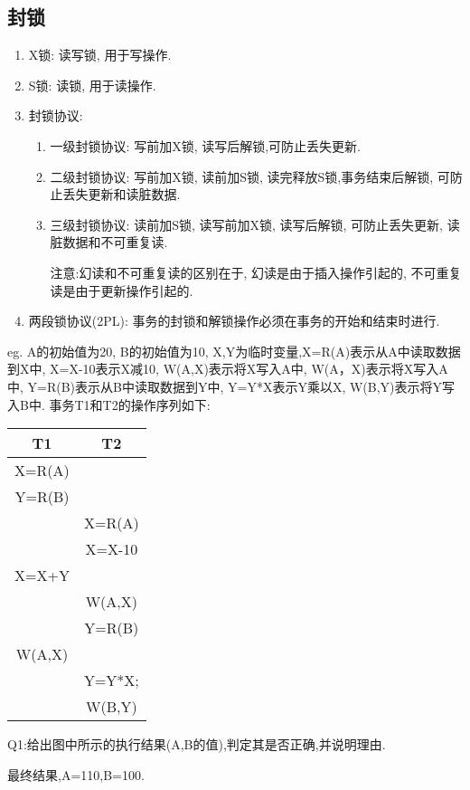 \subsection{封锁}
\begin{enumerate}[label=(\arabic*)]
    \item X锁: 读写锁, 用于写操作.
    \item S锁: 读锁, 用于读操作.
    \item 封锁协议:
    \begin{enumerate}[label=\alph*.]
        \item 一级封锁协议: 写前加X锁, 读写后解锁,可防止丢失更新.
        \item 二级封锁协议: 写前加X锁, 读前加S锁, 读完释放S锁,事务结束后解锁, 可防止丢失更新和读脏数据.
        \item 三级封锁协议: 读前加S锁, 读写前加X锁, 读写后解锁, 可防止丢失更新, 读脏数据和不可重复读.
        \par 注意:幻读和不可重复读的区别在于, 幻读是由于插入操作引起的, 不可重复读是由于更新操作引起的.
    \end{enumerate}
    \item 两段锁协议(2PL): 事务的封锁和解锁操作必须在事务的开始和结束时进行.
\end{enumerate}
eg. A的初始值为20, B的初始值为10, X,Y为临时变量,X=R(A)表示从A中读取数据到X中, X=X-10表示X减10, W(A,X)表示将X写入A中,
W(A，X)表示将X写入A中, Y=R(B)表示从B中读取数据到Y中, Y=Y*X表示Y乘以X, W(B,Y)表示将Y写入B中.
事务T1和T2的操作序列如下:
\begin{table}[H] 
    \centering
    \begin{tabular}{cc} %
        \toprule %
        T1 & T2  \\
        \midrule %
        X=R(A) &  \\
        Y=R(B) & \\
        & X=R(A) \\
        & X=X-10 \\
        X=X+Y & \\
        & W(A,X) \\
        & Y=R(B) \\
        W(A,X) & \\
        & Y=Y*X;\\
        & W(B,Y) \\
        \bottomrule %
    \end{tabular}
\end{table}
Q1:给出图中所示的执行结果(A,B的值),判定其是否正确,并说明理由.
\par 最终结果,A=110,B=100.

